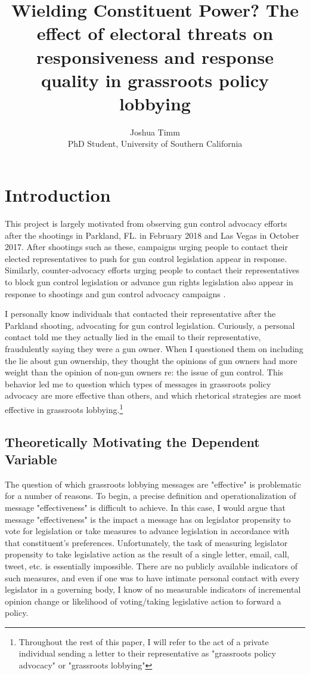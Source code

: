 \documentclass[12pt]{article}\usepackage[]{graphicx}\usepackage[]{color}
\title{Wielding Constituent Power? The effect of electoral threats on responsiveness and response quality in grassroots policy lobbying}
\author{Joshua Timm \\
PhD Student, University of Southern California}
\begin{document}
\maketitle


 
\section{Introduction}
This project is largely motivated from observing gun control advocacy efforts after the shootings in Parkland, FL. in February 2018 and Las Vegas in October 2017. After shootings such as these, campaigns urging people to contact their elected representatives to push for gun control legislation appear in response\citep{Henschel:aa, Brinlee:2018aa, Silverberg:2016aa}. Similarly, counter-advocacy efforts urging people to contact their representatives to block gun control legislation or advance gun rights legislation also appear in response to shootings and gun control advocacy campaigns \citep{Scott-Wong:2018aa, Marans:2018aa}.

I personally know individuals that contacted their representative after the Parkland shooting, advocating for gun control legislation. Curiously, a personal contact told me they actually lied in the email to their representative, fraudulently saying they were a gun owner. When I questioned them on including the lie about gun ownership, they thought the opinions of gun owners had more weight than the opinion of non-gun owners re: the issue of gun control. This behavior led me to question which types of messages in grassroots policy advocacy are more effective than others, and which rhetorical strategies are most effective in grassroots lobbying.\footnote{Throughout the rest of this paper, I will refer to the act of a private individual sending a letter to their representative as "grassroots policy advocacy" or "grassroots lobbying"}
\subsection{Theoretically Motivating the Dependent Variable}
The question of which grassroots lobbying messages are "effective" is problematic for a number of reasons. To begin, a precise definition and operationalization of message "effectiveness" is difficult to achieve. In this case, I would argue that message "effectiveness" is the impact a message has on legislator propensity to vote for legislation or take measures to advance legislation in accordance with that constituent's preferences. Unfortunately, the task of measuring legislator propensity to take legislative action as the result of a single letter, email, call, tweet, etc. is essentially impossible. There are no publicly available indicators of such measures, and even if one was to have intimate personal contact with every legislator in a governing body, I know of no measurable indicators of incremental opinion change or likelihood of voting/taking legislative action to forward a policy.
\end{document}

